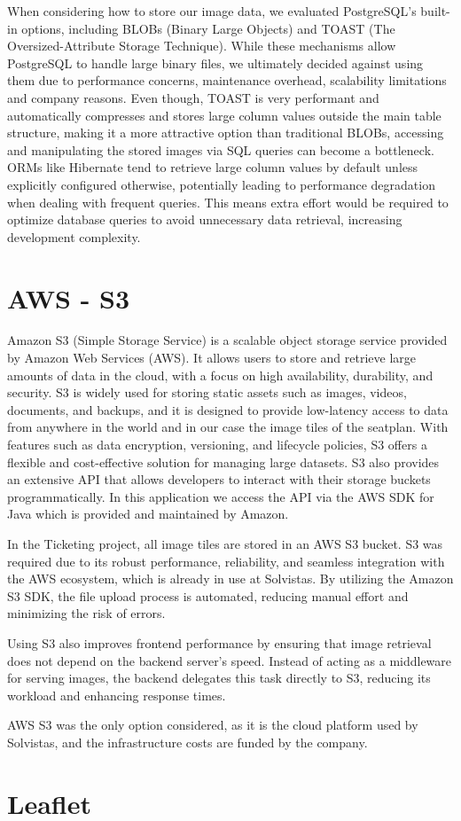 When considering how to store our image data, we evaluated PostgreSQL’s built-in options, including BLOBs (Binary Large Objects) and TOAST (The Oversized-Attribute Storage Technique). While these mechanisms allow PostgreSQL to handle large binary files, we ultimately decided against using them due to performance concerns, maintenance overhead, scalability limitations and company reasons.
Even though, TOAST is very performant and automatically compresses and stores large column values outside the main table structure, making it a more attractive option than traditional BLOBs, accessing and manipulating the stored images via SQL queries can become a bottleneck. ORMs like Hibernate tend to retrieve large column values by default unless explicitly configured otherwise, potentially leading to performance degradation when dealing with frequent queries. This means extra effort would be required to optimize database queries to avoid unnecessary data retrieval, increasing development complexity.


\section{AWS - S3}
Amazon S3 (Simple Storage Service) is a scalable object storage service provided by Amazon Web Services (AWS). It allows users to store and retrieve large amounts of data in the cloud, with a focus on high availability, durability, and security. S3 is widely used for storing static assets such as images, videos, documents, and backups, and it is designed to provide low-latency access to data from anywhere in the world and in our case the image tiles of the seatplan. With features such as data encryption, versioning, and lifecycle policies, S3 offers a flexible and cost-effective solution for managing large datasets. S3 also provides an extensive API that allows developers to interact with their storage buckets programmatically. In this application we access the API via the AWS SDK for Java which is provided and maintained by Amazon.

In the Ticketing project, all image tiles are stored in an AWS S3 bucket. S3 was required due to its robust performance, reliability, and seamless integration with the AWS ecosystem, which is already in use at Solvistas. By utilizing the Amazon S3 SDK, the file upload process is automated, reducing manual effort and minimizing the risk of errors.

Using S3 also improves frontend performance by ensuring that image retrieval does not depend on the backend server’s speed. Instead of acting as a middleware for serving images, the backend delegates this task directly to S3, reducing its workload and enhancing response times.

AWS S3 was the only option considered, as it is the cloud platform used by Solvistas, and the infrastructure costs are funded by the company.


\section{Leaflet}

